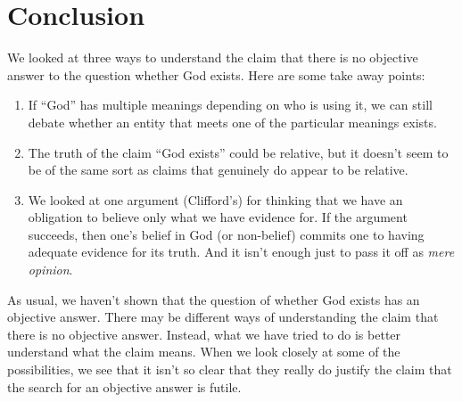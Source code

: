 \documentclass[letterpaper,10pt]{article}
\begin{document}
\section{Conclusion}
We looked at three ways to understand the claim that there is no objective answer to the question whether God exists. Here are some take away points:
\begin{enumerate}
 \item If ``God'' has multiple meanings depending on who is using it, we can still debate whether an entity that meets one of the particular meanings exists.
 \item The truth of the claim ``God exists'' could be relative, but it doesn't seem to be of the same sort as claims that genuinely do appear to be relative.
 \item We looked at one argument (Clifford's) for thinking that we have an obligation to believe only what we have evidence for. If the argument succeeds, then one's belief in God (or non-belief) commits one to having adequate evidence for its truth.  And it isn't enough just to pass it off as \textit{mere opinion}.
\end{enumerate}

As usual, we haven't shown that the question of whether God exists has an objective answer. There may be different ways of understanding the claim that there is no objective answer. Instead, what we have tried to do is better understand what the claim means. When we look closely at some of the possibilities, we see that it isn't so clear that they really do justify the claim that the search for an objective answer is futile.
\end{document}
